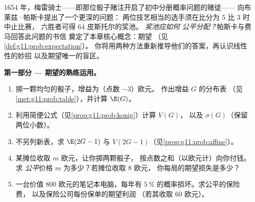 \begin{problem}
\label{pb:g11:prob:1}
1654 年，梅雷骑士——即那位骰子赌注开启了初中分册概率问题的赌徒——
向布莱兹·帕斯卡提出了一个更深的问题：
两位技艺相当的选手须在比分为 $5$ 比 $3$ 时中止比赛，
六胜者可得 $64$ 皮斯托尔的奖池。
\emph{奖池应如何
公平分配？}帕斯卡与费马回答此问题的书信
奠定了本章核心概念：期望
（见\cref{def:g11:prob:expectation}）。
你将用两种方法重新推导他们的答案，再认识线性性的妙招
以及期望唯一的盲区。

\medskip
\noindent\textbf{第一部分 --- 期望的熟练运用。}
\begin{enumerate}
  \item 掷一颗均匀的骰子，增益为（点数 $- 3$）欧元。
        作出增益 $G$ 的分布表
        （见\cref{met:g11:prob:table}），并计算 $\E(G)$。
  \item 利用简便公式（见\cref{prop:g11:prob:konig}）计算 $V(G)$，
        以及 $\sigma(G)$（保留
        两位小数）。
  \item 不另列新表，求 $\E(2G - 1)$ 与
        $V(2G - 1)$（见\cref{prop:g11:prob:affine}）。
  \item 某摊位收取 $m$ 欧元，让你掷两颗骰子，
        按点数之和（以欧元计）向你付钱。求 \emph{公平}价格
        $m$ 为多少？若摊位收取 $8$ 欧元，
        你每局的期望损失是多少？
  \item 一台价值 $800$ 欧元的笔记本电脑，每年有
        $5\,\%$ 的概率损坏。求公平的保险费，
        以及保险公司每份保单的期望利润
        （若其收取 $60$ 欧元）。
\end{enumerate}


\end{problem}
